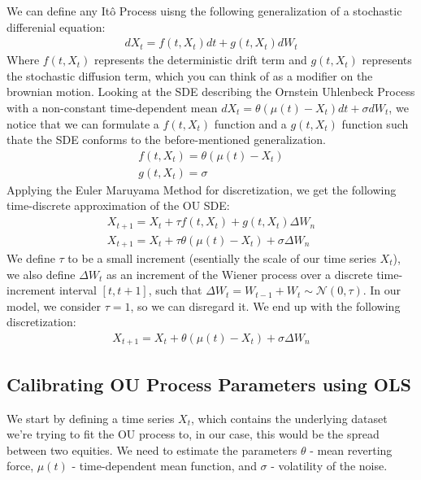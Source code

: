 \documentclass{article}
\begin{document}
\begin{spacing}{2.0}

We can define any Itô Process uisng the following generalization of a stochastic differenial equation:
\begin{gather*}
    dX_{t} = f(t, X_{t})dt + g(t, X_{t})dW_{t}
\end{gather*}
Where $f(t, X_{t})$ represents the deterministic drift term and $g(t, X_{t})$ represents the stochastic diffusion term, which you can think of as a modifier on the brownian motion.
Looking at the SDE describing the Ornstein Uhlenbeck Process with a non-constant time-dependent mean $dX_{t} = \theta \left ( \mu(t) - X_{t} \right )dt + \sigma dW_{t}$, we notice that
we can formulate a $f(t, X_{t})$ function and a $g(t, X_{t})$ function such thate the SDE conforms to the before-mentioned generalization.
\begin{gather*}
    f(t, X_{t}) = \theta \left ( \mu(t) - X_{t} \right ) \\
    g(t, X_{t}) = \sigma
\end{gather*}
Applying the Euler Maruyama Method for discretization, we get the following time-discrete approximation of the OU SDE:
\begin{gather*}
    X_{t + 1} = X_{t} + \tau f(t, X_{t}) + g(t, X_{t}) \Delta W_{n} \\
    X_{t + 1} = X_{t} + \tau \theta \left ( \mu(t) - X_{t} \right )+ \sigma \Delta W_{n}
\end{gather*}
We define $\tau$ to be a small increment (esentially the scale of our time series $X_{t}$), we also define $\Delta W_{t}$ as an increment of the Wiener process over a discrete
time-increment interval $[t, t + 1]$, such that $\Delta W_{t} = W_{t - 1} + W_{t} \sim \mathcal{N}(0, \tau)$. In our model, we consider $\tau = 1$, so we can disregard it.
We end up with the following discretization:
\begin{gather*}
    X_{t + 1} = X_{t} + \theta \left ( \mu(t) - X_{t} \right )+ \sigma \Delta W_{n}
\end{gather*}

\subsection{Calibrating OU Process Parameters using OLS}

We start by defining a time series $X_{t}$, which contains the underlying dataset we're trying to fit the OU process to, in our case, this would be the spread between two equities.
We need to estimate the parameters $\theta$ - mean reverting force, $\mu(t)$ - time-dependent mean function, and $\sigma$ - volatility of the noise.


\end{spacing}
\end{document}
